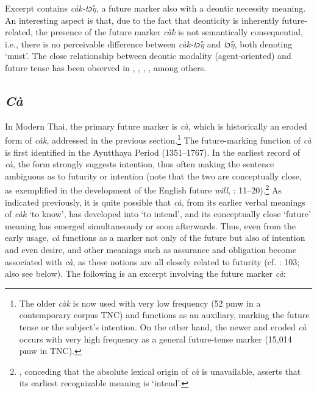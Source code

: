 \documentclass[output=paper,colorlinks,citecolor=brown]{langscibook}
\begin{document}
Excerpt  contains \textit{càk-tɔ̂ŋ}, a future marker also with a deontic necessity meaning. An interesting aspect is that, due to the fact that deonticity is inherently future-related, the presence of the future marker \textit{càk} is not semantically consequential, i.e., there is no perceivable difference between \textit{càk-tɔ̂ŋ} and \textit{tɔ̂ŋ}, both denoting ‘must’. The close relationship between deontic modality (agent-oriented) and future tense has been observed in \citet[]{Fleischman1982}, \citet[]{Dahl1985}, \citet[]{Heine1993}, \citet[]{BybeePerkinsPagliuca1994}, among others. 


\subsection{\textit{Cà}} \label{sec:khammee:2.2}


In Modern Thai, the primary future marker is \textit{cà}, which is historically an eroded form of \textit{càk}, addressed in the previous section.\footnote{The older \textit{càk} is now used with very low frequency (52 pmw in a contemporary corpus TNC) and functions as an auxiliary, marking the future tense or the subject's intention. On the other hand, the newer and eroded \textit{cà} occurs with very high frequency as a general future-tense marker (15,014 pmw in TNC).} The future-marking function of \textit{cà} is first identified in the Ayutthaya Period (1351--1767). In the earliest record of \textit{cà}, the form strongly suggests intention, thus often making the sentence ambiguous as to futurity or intention (note that the two are conceptually close, as exemplified in the development of the English future \textit{will}, \cite{Aijmer1985}: 11--20).\footnote{\citet{Soithurum2010}, conceding that the absolute lexical origin of \textit{cà} is unavailable, asserts that its earliest recognizable meaning is ‘intend’.} As indicated previously, it is quite possible that \textit{cà}, from its earlier verbal meanings of \textit{càk} ‘to know’, has developed into ‘to intend’, and its conceptually close ‘future’ meaning has emerged simultaneously or soon afterwards. Thus, even from the early usage, \textit{cà} functions as a marker not only of the future but also of intention and even desire, and other meanings such as assurance and obligation become associated with \textit{cà}, as these notions are all closely related to futurity (cf. \cite{Dahl1985}: 103; also see below). The following is an excerpt involving the future marker \textit{cà}:
\end{document}
